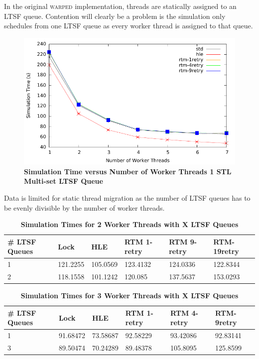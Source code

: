 \documentclass[11pt]{book}
\begin{document}
In the original \textsc{warped} implementation, threads are statically assigned to an LTSF queue.
Contention will clearly be a problem is the simulation only schedules from one LTSF queue
as every worker thread is assigned to that queue.

\begin{figure}[H]
    \centering
    \graphicspath{ {./figures/} }
    \includegraphics[width=\textwidth,height=\textheight,keepaspectratio]{noThrMig-hugeEpidemicSim-timeVSthreads-multiset-1schQ}
    \caption{\textbf{Simulation Time versus Number of Worker Threads 1 STL Multi-set LTSF Queue}}
    \label{fig:noThrMig_timeVSthreads_1schq}
\end{figure}

Data is limited for static thread migration as the number of LTSF queues has to be evenly
divisible by the number of worker threads.

\begin{table}[H]
    \centering
    \begin{tabular}{l|p{2cm}|p{2cm}|p{2cm}|p{2cm}|p{2cm}}
        \textbf{\# LTSF Queues}&Lock &HLE &RTM 1-retry &RTM 9-retry &RTM-19retry \\
        \hline
        \midrule
            1 &121.2255  &105.0569 &123.4132  &124.0336 &122.8344 \\ 
            2 &118.1558  &101.1242 &120.085   &137.5637 &153.0293 \\
    \end{tabular}
    \caption{\textbf{Simulation Times for 2 Worker Threads with X LTSF Queues}}
    \label{tab:noThrMig_2threadsXschq}
\end{table}

\begin{table}[H]
    \centering
    \begin{tabular}{l|p{2cm}|p{2cm}|p{2cm}|p{2cm}|p{2cm}}
        \textbf{\# LTSF Queues}&Lock &HLE &RTM 1-retry &RTM 4-retry &RTM-9retry \\
        \hline
        \midrule
            1 &91.68472 &73.58687 &92.58229  &93.42086 &92.83141 \\ 
            3 &89.50474 &70.24289 &89.48378  &105.8095 &125.8599 \\
    \end{tabular}
    \caption{\textbf{Simulation Times for 3 Worker Threads with X LTSF Queues}}
    \label{tab:noThrMig_3threadsXschq}
\end{table}
\end{document}
